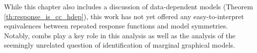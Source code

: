 While this chapter also includes a discussion of data-dependent models (Theorem \ref{th:response_is_cc_hdep}), this work has not yet offered any easy-to-interpret equivalences between repeated response functions and model symmetries. Notably, combs play a key role in this analysis as well as the analysis of the seemingly unrelated question of identification of marginal graphical models.







